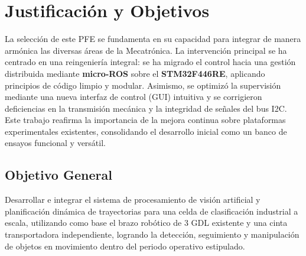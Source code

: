 \documentclass[12pt, a4paper]{report}
\begin{document}
\section{Justificación y Objetivos}
La selección de este PFE se fundamenta en su capacidad para integrar de manera armónica las diversas áreas de la Mecatrónica. La intervención principal se ha centrado en una reingeniería integral: se ha migrado el control hacia una gestión distribuida mediante \textbf{micro-ROS} sobre el \textbf{STM32F446RE}, aplicando principios de código limpio y modular. Asimismo, se optimizó la supervisión mediante una nueva interfaz de control (GUI) intuitiva y se corrigieron deficiencias en la transmisión mecánica y la integridad de señales del bus I2C. Este trabajo reafirma la importancia de la mejora continua sobre plataformas experimentales existentes, consolidando el desarrollo inicial como un banco de ensayos funcional y versátil.

\subsection{Objetivo General}
Desarrollar e integrar el sistema de procesamiento de visión artificial y planificación dinámica de trayectorias para una celda de clasificación industrial a escala, utilizando como base el brazo robótico de 3 GDL existente y una cinta transportadora independiente, logrando la detección, seguimiento y manipulación de objetos en movimiento dentro del periodo operativo estipulado.
\end{document}
